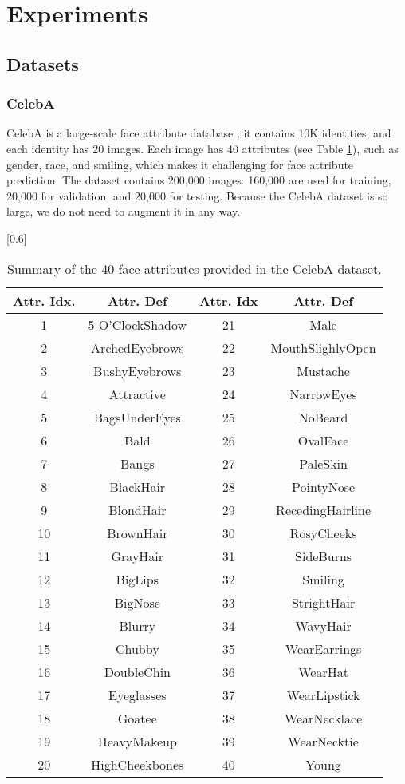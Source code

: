 \documentclass{sig-alternate-05-2015}
\begin{document}
\section{Experiments}
\subsection{Datasets}
\subsubsection{CelebA}
CelebA is a large-scale face attribute database \cite{7410782}; it contains 10K identities, and each identity has 20 images. Each image has 40 attributes (see Table \ref{tab:1}), such as gender, race, and smiling, which makes it challenging for face attribute prediction. The dataset contains 200,000 images: 160,000 are used for training, 20,000 for validation, and 20,000 for testing. Because the CelebA dataset is so large, we do not need to augment it in any way.

\begin{table}[h]
\centering
\caption{Summary of the 40 face attributes provided in the CelebA dataset.}
\scalebox{0.65}[0.6]{
\begin{tabular}{c|c|c|c}
\toprule[2pt]
 Attr. Idx.    & Attr. Def     &Attr. Idx  &Attr. Def \\ \midrule[1pt]
 1 & 5 O'ClockShadow & 21 &Male\\
 2& ArchedEyebrows & 22&MouthSlighlyOpen\\
 3&BushyEyebrows&23&Mustache\\
 4&Attractive&24&NarrowEyes\\
 5&BagsUnderEyes&25&NoBeard\\
 6&Bald&26&OvalFace\\
 7&Bangs&27&PaleSkin\\
 8&BlackHair&28&PointyNose\\
 9&BlondHair&29&RecedingHairline\\
 10&BrownHair&30&RosyCheeks\\
 11&GrayHair&31&SideBurns\\
 12&BigLips&32&Smiling\\
 13&BigNose&33&StrightHair\\
 14&Blurry&34&WavyHair\\
 15&Chubby&35&WearEarrings\\
 16&DoubleChin&36&WearHat\\
 17&Eyeglasses&37&WearLipstick\\
 18&Goatee&38&WearNecklace\\
 19&HeavyMakeup&39&WearNecktie\\
 20&HighCheekbones&40&Young \\
\bottomrule[2pt]
\end{tabular}}
\label{tab:1}
\end{table}
\end{document}
